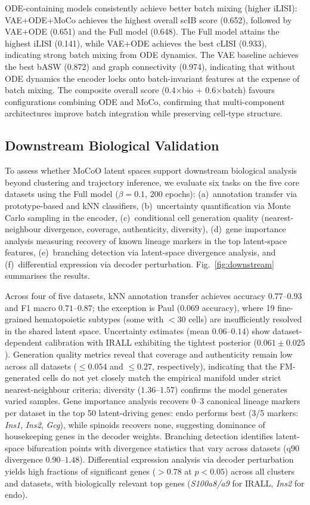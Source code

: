 \documentclass[biology,article,submit,pdftex]{Definitions/mdpi}
\begin{document}
ODE-containing models consistently achieve better batch mixing (higher iLISI): VAE+ODE+MoCo achieves the highest overall scIB score (0.652), followed by VAE+ODE (0.651) and the Full model (0.648). The Full model attains the highest iLISI (0.141), while VAE+ODE achieves the best cLISI (0.933), indicating strong batch mixing from ODE dynamics. The VAE baseline achieves the best bASW (0.872) and graph connectivity (0.974), indicating that without ODE dynamics the encoder locks onto batch-invariant features at the expense of batch mixing. The composite overall score (0.4$\times$bio + 0.6$\times$batch) favours configurations combining ODE and MoCo, confirming that multi-component architectures improve batch integration while preserving cell-type structure.

\subsection{Downstream Biological Validation}
\label{sec:results:downstream}

To assess whether MoCoO latent spaces support downstream biological analysis beyond clustering and trajectory inference, we evaluate six tasks on the five core datasets using the Full model ($\beta{=}0.1$, 200 epochs): (a)~annotation transfer via prototype-based and kNN classifiers, (b)~uncertainty quantification via Monte Carlo sampling in the encoder, (c)~conditional cell generation quality (nearest-neighbour divergence, coverage, authenticity, diversity), (d)~gene importance analysis measuring recovery of known lineage markers in the top latent-space features, (e)~branching detection via latent-space divergence analysis, and (f)~differential expression via decoder perturbation. Fig.~\ref{fig:downstream} summarises the results.

Across four of five datasets, kNN annotation transfer achieves accuracy $0.77$--$0.93$ and F1 macro $0.71$--$0.87$; the exception is Paul ($0.069$ accuracy), where 19 fine-grained hematopoietic subtypes (some with $< 30$ cells) are insufficiently resolved in the shared latent space. Uncertainty estimates (mean $0.06$--$0.14$) show dataset-dependent calibration with IRALL exhibiting the tightest posterior ($0.061 \pm 0.025$). Generation quality metrics reveal that coverage and authenticity remain low across all datasets ($\leq 0.054$ and $\leq 0.27$, respectively), indicating that the FM-generated cells do not yet closely match the empirical manifold under strict nearest-neighbour criteria; diversity ($1.36$--$1.57$) confirms the model generates varied samples. Gene importance analysis recovers 0--3 canonical lineage markers per dataset in the top 50 latent-driving genes: endo performs best (3/5 markers: \textit{Ins1}, \textit{Ins2}, \textit{Gcg}), while spinoids recovers none, suggesting dominance of housekeeping genes in the decoder weights. Branching detection identifies latent-space bifurcation points with divergence statistics that vary across datasets (q90 divergence $0.90$--$1.48$). Differential expression analysis via decoder perturbation yields high fractions of significant genes ($> 0.78$ at $p < 0.05$) across all clusters and datasets, with biologically relevant top genes (\textit{S100a8/a9} for IRALL, \textit{Ins2} for endo).
\end{document}
